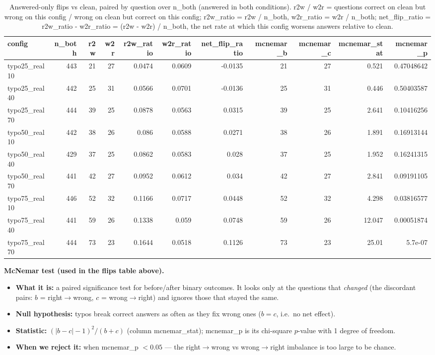 \documentclass[11pt]{article}
\begin{document}
\begin{table}[H]
\centering
\caption{Answered-only flips vs clean, paired by question over n\_both (answered in both conditions). r2w / w2r = questions correct on clean but wrong on this config / wrong on clean but correct on this config; r2w\_ratio = r2w / n\_both, w2r\_ratio = w2r / n\_both; net\_flip\_ratio = r2w\_ratio - w2r\_ratio = (r2w - w2r) / n\_both, the net rate at which this config worsens answers relative to clean.}
\small
\begin{adjustbox}{max width=\textwidth}
\begin{tabular}{lrrrrrrrrrr}
\toprule
\textbf{config} & \textbf{n\_both} & \textbf{r2w} & \textbf{w2r} & \textbf{r2w\_ratio} & \textbf{w2r\_ratio} & \textbf{net\_flip\_ratio} & \textbf{mcnemar\_b} & \textbf{mcnemar\_c} & \textbf{mcnemar\_stat} & \textbf{mcnemar\_p} \\
\midrule
typo25\_real10 & 443 & 21 & 27 & 0.0474 & 0.0609 & -0.0135 & 21 & 27 & 0.521 & 0.47048642 \\
typo25\_real40 & 442 & 25 & 31 & 0.0566 & 0.0701 & -0.0136 & 25 & 31 & 0.446 & 0.50403587 \\
typo25\_real70 & 444 & 39 & 25 & 0.0878 & 0.0563 & 0.0315 & 39 & 25 & 2.641 & 0.10416256 \\
typo50\_real10 & 442 & 38 & 26 & 0.086 & 0.0588 & 0.0271 & 38 & 26 & 1.891 & 0.16913144 \\
typo50\_real40 & 429 & 37 & 25 & 0.0862 & 0.0583 & 0.028 & 37 & 25 & 1.952 & 0.16241315 \\
typo50\_real70 & 441 & 42 & 27 & 0.0952 & 0.0612 & 0.034 & 42 & 27 & 2.841 & 0.09191105 \\
typo75\_real10 & 446 & 52 & 32 & 0.1166 & 0.0717 & 0.0448 & 52 & 32 & 4.298 & 0.03816577 \\
typo75\_real40 & 441 & 59 & 26 & 0.1338 & 0.059 & 0.0748 & 59 & 26 & 12.047 & 0.00051874 \\
typo75\_real70 & 444 & 73 & 23 & 0.1644 & 0.0518 & 0.1126 & 73 & 23 & 25.01 & 5.7e-07 \\
\bottomrule
\end{tabular}
\end{adjustbox}
\end{table}

\medskip
\noindent\textbf{McNemar test (used in the flips table above).}
\begin{itemize}\setlength{\itemsep}{1pt}
  \item \textbf{What it is:} a paired significance test for before/after binary
  outcomes. It looks only at the questions that \emph{changed} (the discordant pairs:
  $b$ = right$\to$wrong, $c$ = wrong$\to$right) and ignores those that stayed the same.
  \item \textbf{Null hypothesis:} typos break correct answers as often as they fix
  wrong ones ($b = c$, i.e.\ no net effect).
  \item \textbf{Statistic:} $(|b - c| - 1)^2 / (b + c)$ (column mcnemar\_stat);
  mcnemar\_p is its chi-square $p$-value with 1 degree of freedom.
  \item \textbf{When we reject it:} when mcnemar\_p $< 0.05$ --- the
  right$\to$wrong vs wrong$\to$right imbalance is too large to be chance.
\end{itemize}
\end{document}
